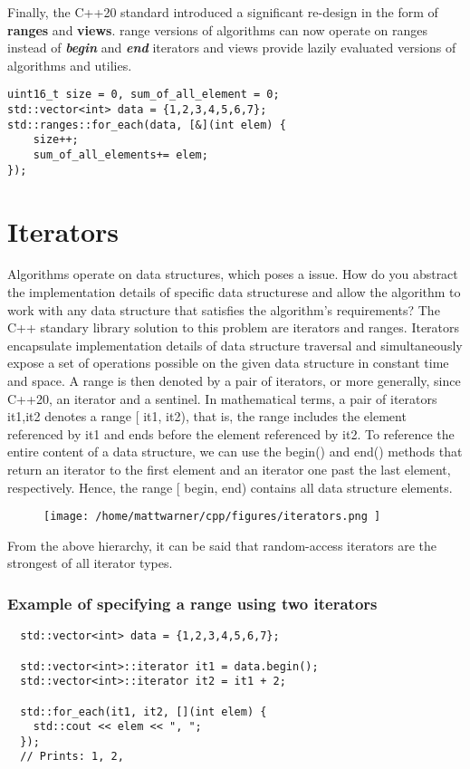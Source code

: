 \documentclass{report}
\begin{document}
\bigbreak \noindent \bigbreak \noindent
Finally, the C++20 standard introduced a significant re-design in the form of \textbf{ranges} and \textbf{views}.
\bigbreak \noindent
range versions of algorithms can now operate on ranges instead of \textbf{\textit{begin}} and \textbf{\textit{end}} iterators and views provide lazily evaluated versions of algorithms and utilies.
\begin{verbatim} 
uint16_t size = 0, sum_of_all_element = 0;
std::vector<int> data = {1,2,3,4,5,6,7};
std::ranges::for_each(data, [&](int elem) {
    size++;
    sum_of_all_elements+= elem;
});
\end{verbatim}
\section{Iterators}
Algorithms operate on data structures, which poses a issue. How do you abstract the implementation details of specific data structurese and allow the algorithm to work with any data structure that satisfies the algorithm's requirements?
\bigbreak \noindent
The C++ standary library solution to this problem are iterators and ranges. Iterators encapsulate implementation details of data structure traversal and simultaneously expose a set of operations possible on the given data structure in constant time and space.
\bigbreak \noindent
A range is then denoted by a pair of iterators, or more generally, since C++20, an iterator and a sentinel. In mathematical terms, a pair of iterators it1,it2 denotes a range [ it1, it2), that is, the range includes the element referenced by it1 and ends before the element referenced by it2.
\bigbreak \noindent
To reference the entire content of a data structure, we can use the begin() and end() methods that return an iterator to the first element and an iterator one past the last element, respectively. Hence, the range [ begin, end) contains all data structure elements.
\begin{figure}[ht]
\centering
\texttt{[image:  /home/mattwarner/cpp/figures/iterators.png ]}
 \end{figure}
 \bigbreak \noindent
 From the above hierarchy, it can be said that random-access iterators are the strongest of all iterator types.
\subsubsection*{Example of specifying a range using two iterators}
\begin{verbatim}
  std::vector<int> data = {1,2,3,4,5,6,7};

  std::vector<int>::iterator it1 = data.begin();
  std::vector<int>::iterator it2 = it1 + 2;
  
  std::for_each(it1, it2, [](int elem) {
    std::cout << elem << ", ";
  });
  // Prints: 1, 2,
\end{verbatim}
\end{document}
